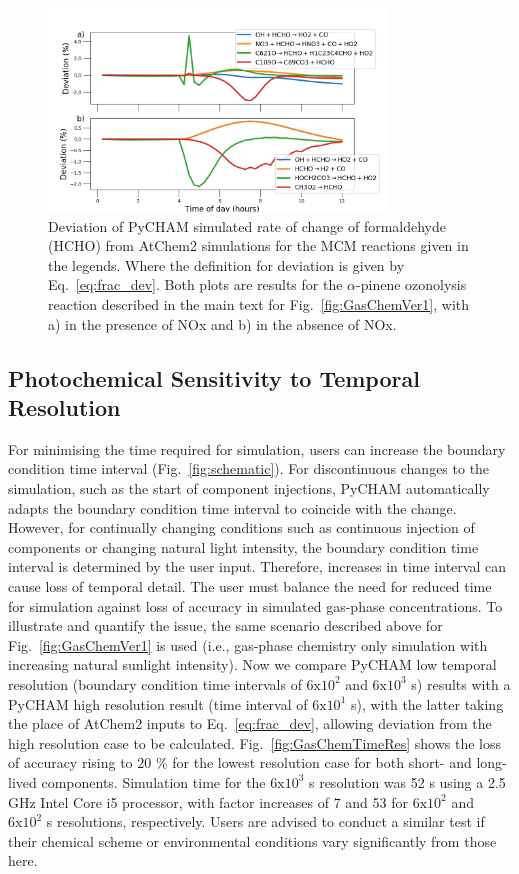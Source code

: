 \documentclass[gmd, manuscript]{copernicus}
\begin{document}
\begin{figure}[t]
\includegraphics[width=9.0cm]{Results/photo_chem_grad_dev.png}
\caption{Deviation of PyCHAM simulated rate of change of formaldehyde (HCHO) from AtChem2 simulations for the MCM reactions given in the legends.  Where the definition for deviation is given by Eq.~\ref{eq:frac_dev}.  Both plots are results for the $\alpha$-pinene ozonolysis reaction described in the main text for Fig.~\ref{fig:GasChemVer1}, with a) in the presence of NOx and b) in the absence of NOx.}
\label{fig:GasChemVer2}
\end{figure}


\subsection{Photochemical Sensitivity to Temporal Resolution}

For minimising the time required for simulation, users can increase the boundary condition time interval (Fig.~\ref{fig:schematic}).  For discontinuous changes to  the simulation, such as the start of component injections, PyCHAM automatically adapts the boundary condition time interval to coincide with the change.  However, for continually changing conditions such as continuous injection of components or changing natural light intensity, the boundary condition time interval is determined by the user input.  Therefore, increases in time interval can cause loss of temporal detail.  The user must balance the need for reduced time for simulation against loss of accuracy in simulated gas-phase concentrations.  To illustrate and quantify the issue, the same scenario described above for Fig.~\ref{fig:GasChemVer1} is used (i.e., gas-phase chemistry only simulation with increasing natural sunlight intensity).  Now we compare PyCHAM low temporal resolution (boundary condition time intervals of $\mathrm{6x10^2}$ and $\mathrm{6x10^3}$ s) results with a PyCHAM high resolution result (time interval of $\mathrm{6x10^1}$ s), with the latter taking the place of AtChem2 inputs to Eq.~\ref{eq:frac_dev}, allowing deviation from the high resolution case to be calculated.  Fig.~\ref{fig:GasChemTimeRes} shows the loss of accuracy rising to 20 \% for the lowest resolution case for both short- and long-lived components.  Simulation time for the $\mathrm{6x10^3}$ s resolution was 52 s using a 2.5 GHz Intel Core i5 processor, with factor increases of 7 and 53 for $\mathrm{6x10^2}$ and $\mathrm{6x10^2}$ s resolutions, respectively.  Users are advised to conduct a similar test if their chemical scheme or environmental conditions vary significantly from those here.
\end{document}
